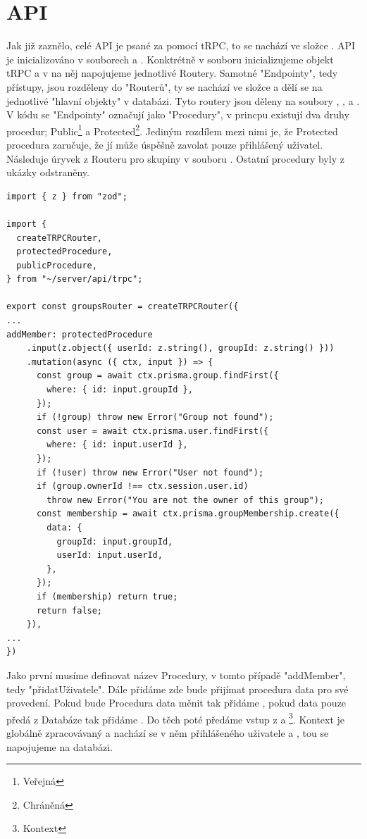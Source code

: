 \section{API}
Jak již zaznělo, celé API je psané za pomocí tRPC, to se nachází ve složce .
API je inicializováno v souborech  a . Konktrétně v souboru  inicializujeme objekt tRPC a v  na něj napojujeme jednotlivé Routery. Samotné "Endpointy", tedy přístupy, jsou rozděleny do "Routerů", ty se nachází ve složce  a dělí se na jednotlivé "hlavní objekty" v databázi. Tyto routery jsou děleny na soubory , ,  a . V kódu se "Endpointy" označují jako "Procedury", v princpu existují dva druhy procedur; Public\footnote{Veřejná} a Protected\footnote{Chráněná}. Jediným rozdílem mezi nimi je, že Protected procedura zaručuje, že jí může úspěšně zavolat pouze přihlášený uživatel.
Následuje úryvek z Routeru pro skupiny v souboru . Ostatní procedury byly z ukázky odstraněny.
\begin{lstlisting}[caption={Procedura na přidání uživatele do skupiny}]
import { z } from "zod";

import {
  createTRPCRouter,
  protectedProcedure,
  publicProcedure,
} from "~/server/api/trpc";

export const groupsRouter = createTRPCRouter({
...
addMember: protectedProcedure
    .input(z.object({ userId: z.string(), groupId: z.string() }))
    .mutation(async ({ ctx, input }) => {
      const group = await ctx.prisma.group.findFirst({
        where: { id: input.groupId },
      });
      if (!group) throw new Error("Group not found");
      const user = await ctx.prisma.user.findFirst({
        where: { id: input.userId },
      });
      if (!user) throw new Error("User not found");
      if (group.ownerId !== ctx.session.user.id)
        throw new Error("You are not the owner of this group");
      const membership = await ctx.prisma.groupMembership.create({
        data: {
          groupId: input.groupId,
          userId: input.userId,
        },
      });
      if (membership) return true;
      return false;
    }),
...
})
\end{lstlisting}
Jako první musíme definovat název Procedury, v tomto případě "addMember", tedy "přidatUživatele". Dále přidáme  zde bude přijímat procedura data pro své provedení. Pokud bude Procedura data měnit tak přidáme , pokud data pouze předá z Databáze tak přidáme . Do těch poté předáme vstup z  a \footnote{Kontext}. Kontext je globálně zpracovávaný a nachází se v něm  přihlášeného uživatele a , tou se napojujeme na databázi.
